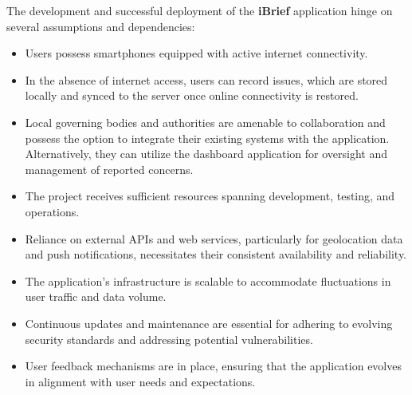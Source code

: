 The development and successful deployment of the \textbf{iBrief} application hinge on several assumptions and dependencies:

\begin{itemize}
    \item Users possess smartphones equipped with active internet connectivity.
    \item In the absence of internet access, users can record issues, which are stored locally and synced to the server once online connectivity is restored.
    \item Local governing bodies and authorities are amenable to collaboration and possess the option to integrate their existing systems with the application. Alternatively, they can utilize the \gls{dashboard application} for oversight and management of reported concerns.
    \item The project receives sufficient resources spanning development, testing, and operations.
    \item Reliance on external \gls{API}s and web services, particularly for geolocation data and push notifications, necessitates their consistent availability and reliability.
    \item The application's infrastructure is scalable to accommodate fluctuations in user traffic and data volume.
    \item Continuous updates and maintenance are essential for adhering to evolving security standards and addressing potential vulnerabilities.
    \item User feedback mechanisms are in place, ensuring that the application evolves in alignment with user needs and expectations.
\end{itemize}
